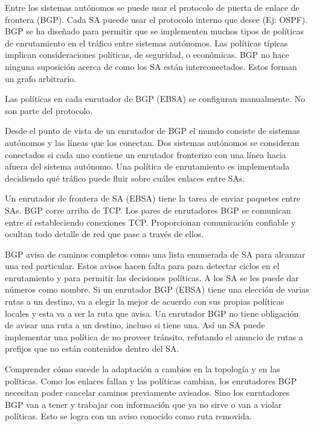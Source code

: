 \documentclass[10pt,a4paper]{report}
\begin{document}
	\par Entre los sistemas autónomos se puede usar el protocolo de puerta de enlace de frontera (BGP). Cada SA pueede usar el protocolo interno que desee (Ej: OSPF). BGP se ha diseñado para permitir que se implementen muchos tipos de políticas de enrutamiento en el tráfico entre sistemas autónomos. Las políticas típicas implican consideraciones políticas, de seguridad, o económicas. BGP no hace ninguna suposición acerca de como los SA están interconectados. Estos forman un grafo arbitrario.

Las políticas en cada enrutador de BGP (EBSA) se configuran manualmente. No son parte del protocolo.
\par Desde el punto de vista de un enrutador de BGP el mundo consiste de sistemas autónomos y las líneas que los conectan. Dos sistemas autónomos se consideran conectados si cada uno contiene un enrutador fronterizo con una línea hacia afuera del sistema autónomo. Una política de enrutamiento es implementada decidiendo qué tráfico puede fluir sobre cuáles enlaces entre SAs.

	\par Un enrutador de frontera de SA (EBSA) tiene la tarea de enviar paquetes entre SAs. BGP corre arriba de TCP. Los pares de enrutadores BGP se comunican entre sí estableciendo conexiones TCP. Proporcionan comunicación confiable y ocultan todo detalle de red que pase a través de ellos.

	\par BGP avisa de caminos completos como una lista enumerada de SA para alcanzar una red particular. Estos avisos hacen falta para para detectar ciclos en el enrutamiento y para permitir las decisiones políticas. A los SA se les puede dar números como nombre.
Si un enrutador BGP (EBSA) tiene una elección de varias rutas a un destino, va a elegir la mejor de acuerdo con sus propias políticas locales y esta va a ser la ruta que avisa. Un enrutador BGP no tiene obligación de avisar una ruta a un destino, incluso si tiene una.
Así un SA puede implementar una política de no proveer tránsito, refutando el anuncio de rutas a prefijos que no están contenidos dentro del SA.

	\par Comprender cómo sucede la adaptación a cambios en la topología y en las políticas. Como los enlaces fallan y las políticas cambian, los enrutadores BGP necesitan poder cancelar caminos previamente avisados. Sino los enrutadores BGP van a tener y trabajar con información que ya no sirve o van a violar políticas. Esto se logra con un aviso conocido como ruta removida.
\end{document}

